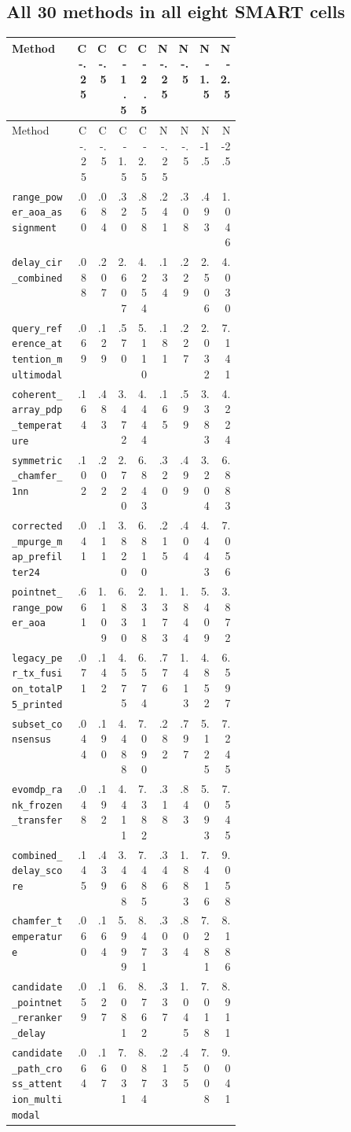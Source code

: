 \documentclass[10pt]{article}
\newcommand{\code}[1]{\nolinkurl{#1}}
\begin{document}
\subsection{All 30 methods in all eight SMART cells}

\begin{landscape}
\begingroup
\scriptsize
\setlength{\tabcolsep}{3pt}
\begin{longtable}{@{}p{0.34\linewidth}rrrrrrrr@{}}
\toprule
Method & C-.25 & C-.5 & C-1.5 & C-2.5 & N-.25 & N-.5 & N-1.5 & N-2.5\\
\midrule
\endfirsthead
\toprule Method & C-.25 & C-.5 & C-1.5 & C-2.5 & N-.25 & N-.5 & N-1.5 & N-2.5\\\midrule
\endhead
\code{range_power_aoa_assignment} & .060 & .084 & .320 & .858 & .241 & .308 & .493 & 1.046\\
\code{delay_cir_combined} & .088 & .207 & 2.607 & 4.254 & .134 & .229 & 2.506 & 4.030\\
\code{query_reference_attention_multimodal} & .069 & .129 & .570 & 5.110 & .181 & .227 & 2.032 & 7.141\\
\code{coherent_array_pdp_temperature} & .164 & .483 & 3.472 & 4.444 & .165 & .599 & 3.383 & 4.224\\
\code{symmetric_chamfer_1nn} & .102 & .202 & 2.720 & 6.843 & .320 & .499 & 3.204 & 6.883\\
\code{corrected_mpurge_map_prefilter24} & .041 & .111 & 3.820 & 6.810 & .215 & .404 & 4.443 & 7.056\\
\code{pointnet_range_power_aoa} & .661 & 1.109 & 6.830 & 2.318 & 1.373 & 1.844 & 5.409 & 3.872\\
\code{legacy_per_tx_fusion_totalP5_printed} & .071 & .142 & 4.575 & 6.574 & .776 & 1.413 & 4.852 & 6.597\\
\code{subset_consensus} & .044 & .190 & 4.488 & 7.090 & .282 & .797 & 5.125 & 7.245\\
\code{evomdp_rank_frozen_transfer} & .048 & .192 & 4.411 & 7.382 & .318 & .843 & 5.093 & 7.545\\
\code{combined_delay_score} & .145 & .439 & 3.468 & 7.485 & .346 & 1.883 & 7.416 & 9.058\\
\code{chamfer_temperature} & .060 & .164 & 5.999 & 8.471 & .303 & .804 & 7.281 & 8.186\\
\code{candidate_pointnet_reranker_delay} & .059 & .127 & 6.081 & 8.762 & .337 & 1.045 & 7.018 & 8.911\\
\code{candidate_path_cross_attention_multimodal} & .064 & .167 & 7.031 & 8.874 & .213 & .455 & 7.008 & 9.041\\

\end{longtable}
\end{landscape}
\end{document}
